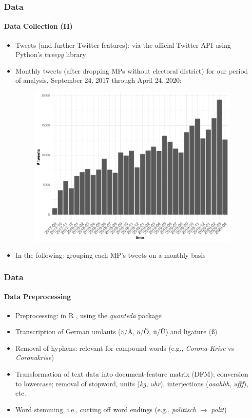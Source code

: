 \documentclass[xcolor=dvipsnames]{beamer}
\begin{document}
\begin{frame}
\frametitle{Data}
\framesubtitle{Data Collection (II)}
\begin{itemize}
\item Tweets (and further Twitter features): via the official Twitter API using Python's \textit{tweepy} library\cite{roesslein2020tweepy}
\item Monthly tweets (after dropping MPs without electoral district) for our period of analysis, September 24, 2017 through April 24, 2020:
	\begin{figure}[h!]
  	\centering
  	\includegraphics[scale = 0.30]{../plots/3/monthly_tweets.pdf}
	\end{figure}
\item In the following: grouping each MP's tweets on a monthly basis
\end{itemize}
\end{frame}

\begin{frame}
\frametitle{Data}
\framesubtitle{Data Preprocessing}
\begin{itemize}
\item Preprocessing: in R \cite{R}, using the \textit{quanteda} package \cite{quanteda}
\item Transcription of German umlauts (\"a/\"A, \"o/\"O, \"u/\"U) and ligature (\ss)
\item Removal of hyphens: relevant for compound words (e.g., \textit{Corona-Krise} vs \textit{Coronakrise})
\item Transformation of text data into document-feature matrix (DFM); conversion to lowercase; removal of stopword, units (\textit{kg}, \textit{uhr}), interjections (\textit{aaahhh}, \textit{ufff}), etc.
\item Word stemming, i.e., cutting off word endings (e.g., \textit{politisch} $\rightarrow$ \textit{polit}) \cite{lucas2015computer}
\end{itemize}
\end{frame}
\end{document}
